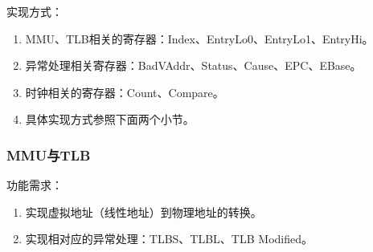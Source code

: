             实现方式：
            \begin{enumerate}
            \item
            MMU、TLB相关的寄存器：Index、EntryLo0、EntryLo1、EntryHi。
            \item
            异常处理相关寄存器：BadVAddr、Status、Cause、EPC、EBase。
            \item
            时钟相关的寄存器：Count、Compare。
            \item
            具体实现方式参照下面两个小节。
            \end{enumerate}

        \subsubsection{MMU与TLB}
            功能需求：
            \begin{enumerate}
            \item
            实现虚拟地址（线性地址）到物理地址的转换。
            \item
            实现相对应的异常处理：TLBS、TLBL、TLB Modified。
            \end{enumerate}


